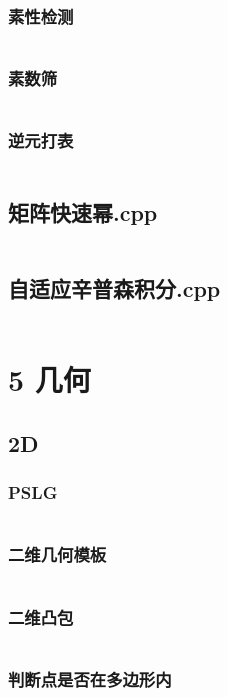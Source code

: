 \documentclass{article}
\begin{document}
\subsubsection{素性检测}
\inputminted{c++}{/home/zzuzxy/t2/Template1.0/4 数学/数论/素性检测.cpp}
\subsubsection{素数筛}
\inputminted{c++}{/home/zzuzxy/t2/Template1.0/4 数学/数论/素数筛.cpp}
\subsubsection{逆元打表}
\inputminted{c++}{/home/zzuzxy/t2/Template1.0/4 数学/数论/逆元打表.cpp}
\subsection{矩阵快速幂.cpp}
\inputminted{c++}{/home/zzuzxy/t2/Template1.0/4 数学/矩阵快速幂.cpp}
\subsection{自适应辛普森积分.cpp}
\inputminted{c++}{/home/zzuzxy/t2/Template1.0/4 数学/自适应辛普森积分.cpp}
\section{5 几何}
\subsection{2D}
\subsubsection{PSLG}
\inputminted{c++}{/home/zzuzxy/t2/Template1.0/5 几何/2D/PSLG.cpp}
\subsubsection{二维几何模板}
\inputminted{c++}{/home/zzuzxy/t2/Template1.0/5 几何/2D/二维几何模板.cpp}
\subsubsection{二维凸包}
\inputminted{c++}{/home/zzuzxy/t2/Template1.0/5 几何/2D/二维凸包.cpp}
\subsubsection{判断点是否在多边形内}
\inputminted{c++}{/home/zzuzxy/t2/Template1.0/5 几何/2D/判断点是否在多边形内.cpp}
\end{document}
